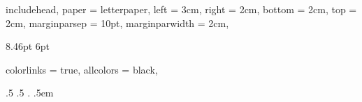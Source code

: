 \RequirePackage { geometry }
\RequirePackage { setspace }
\RequirePackage { microtype }
\RequirePackage { enumitem }
\RequirePackage [ spanish ] { babel }
\RequirePackage { csquotes }
\RequirePackage { biblatex }
\RequirePackage { xcolor }
\RequirePackage { hyperref }
\RequirePackage { graphicx }
\RequirePackage { mathtools, amsthm, amsfonts }
\RequirePackage { dirtytalk }
\RequirePackage [ spanish ] { cleveref }
\RequirePackage { epigraph }

\ExplSyntaxOn
\makeatletter


\geometry
    {
        includehead,
        paper = letterpaper,
        left = 3cm,
        right = 2cm,
        bottom = 2cm,
        top = 2cm,
        marginparsep = 10pt,
        marginparwidth = 2cm,
    }

\usepackage[lf]{Baskervaldx} %
\usepackage[bigdelims,vvarbb,baskervaldx]{newtxmath} %
\usepackage[cal=boondoxo]{mathalfa} %
\usepackage[scale=.9]{courierten}
\newcommand{\titlefont}{\bfseries}

\setlength { \parindent } { 8.46pt }
\setlength { \parskip } { 6pt }
\onehalfspacing

\pagestyle{headings}
\gdef\@oddhead{\hfil\thepage}



\hypersetup
    {
        colorlinks = true,
        allcolors = black,
    }

    {.5\baselineskip}%
    {.5\baselineskip}%
    {}%
    {}%
    {\scshape}%
    {.}%
    {.5em}%
    {}%
\theoremstyle{defi}
\newtheorem{defi}{Definición}[chapter]

